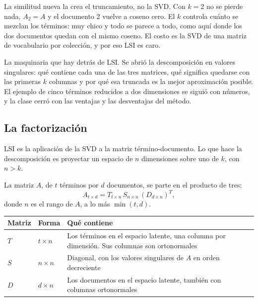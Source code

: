 \documentclass[11pt,letterpaper]{article}
\begin{document}
\begin{ojo}
    La similitud nueva la crea el truncamiento, no la SVD. Con
    $k = 2$ no se pierde nada, $A_2 = A$ y el documento 2 vuelve a
    coseno cero. El $k$ controla cuánto se mezclan los términos: muy
    chico y todo se parece a todo, como aquí donde los dos documentos
    quedan con el mismo coseno. El costo es la SVD de una matriz de
    vocabulario por colección, y por eso LSI es caro.
\end{ojo}


\newpage


\begin{quick_sum}
    La maquinaria que hay detrás de LSI. Se abrió la descomposición en
    valores singulares: qué contiene cada una de las tres matrices, qué
    significa quedarse con las primeras $k$ columnas y por qué esa
    truncada es la mejor aproximación posible. El ejemplo de cinco
    términos reducidos a dos dimensiones se siguió con números, y la
    clase cerró con las ventajas y las desventajas del método.
\end{quick_sum}

\subsection*{La factorización}

LSI es la aplicación de la SVD a la matriz término-documento. Lo que
hace la descomposición es proyectar un espacio de $n$ dimensiones
sobre uno de $k$, con $n > k$.

La matriz $A$, de $t$ términos por $d$ documentos, se parte en el
producto de tres:
\[
    A_{t \times d} = T_{t \times n}\, S_{n \times n}\,
                     (D_{d \times n})^{T} ,
\]
donde $n$ es el rango de $A$, a lo más $\min(t, d)$.

\begin{center}
\begin{tabular}{>{\raggedright\arraybackslash}p{1.4cm}
                >{\raggedright\arraybackslash}p{2.2cm}
                >{\raggedright\arraybackslash}p{8.8cm}}
    \toprule
    \textbf{Matriz} & \textbf{Forma} & \textbf{Qué contiene} \\
    \midrule
    $T$ & $t \times n$ &
    Los términos en el espacio latente, una columna por dimensión.
    Sus columnas son ortonormales \\
    \addlinespace
    $S$ & $n \times n$ &
    Diagonal, con los valores singulares de $A$ en orden decreciente \\
    \addlinespace
    $D$ & $d \times n$ &
    Los documentos en el espacio latente, también con columnas
    ortonormales \\
    \bottomrule
\end{tabular}
\end{center}
\end{document}
